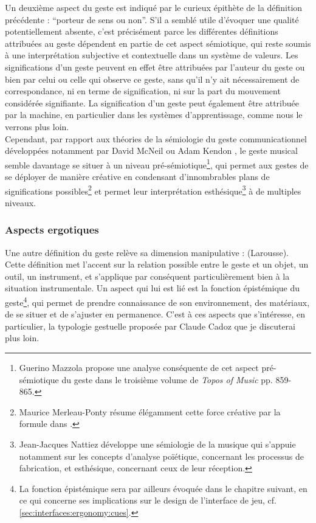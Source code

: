 \noindent Un deuxième aspect du geste est indiqué par le curieux épithète de la définition précédente : ``porteur de sens ou non''. S'il a semblé utile d'évoquer une qualité potentiellement absente, c'est précisément parce les différentes définitions attribuées au geste dépendent en partie de cet aspect sémiotique, qui reste soumis à une interprétation subjective et contextuelle dans un système de valeurs. Les significations d'un geste peuvent en effet être attribuées par l'auteur du geste ou bien par celui ou celle qui observe ce geste, sans qu'il n'y ait nécessairement de correspondance, ni en terme de signification, ni sur la part du mouvement considérée signifiante. La signification d'un geste peut également être attribuée par la machine, en particulier dans les systèmes d'apprentissage, comme nous le verrons plus loin.\\
\indent Cependant, par rapport aux théories de la sémiologie du geste communicationnel développées notamment par David McNeil \cite{mcneill_gesture_2005} ou Adam Kendon \cite{kendon_gesture:_2004}, le geste musical semble davantage se situer à un niveau pré-sémiotique\footnote{Guerino Mazzola propose une analyse conséquente de cet aspect pré-sémiotique du geste dans le troisième volume de \textit{Topos of Music} \cite{mazzola_topos_2018} pp. 859-865.}, qui permet aux gestes de se déployer de manière créative en condensant d'innombrables plans de significations possibles\footnote{Maurice Merleau-Ponty résume élégamment cette force créative par la formule  dans \cite{merleau-ponty_phenomenologie_1976}.} et permet leur interprétation esthésique\footnote{Jean-Jacques Nattiez développe une sémiologie de la musique qui s'appuie notamment sur les concepts d'analyse poïétique, concernant les processus de fabrication, et esthésique, concernant ceux de leur réception.} à de multiples niveaux.

\subsubsection{Aspects ergotiques}

\noindent Une autre définition du geste relève sa dimension manipulative :  (Larousse). Cette définition met l'accent sur la relation possible entre le geste et un objet, un outil, un instrument, et s'applique par conséquent particulièrement bien à la situation instrumentale. Un aspect qui lui est lié est la fonction épistémique du geste\footnote{La fonction épistémique sera par ailleurs évoquée dans le chapitre suivant, en ce qui concerne ses implications sur le design de l'interface de jeu, cf. \ref{sec:interfaces:ergonomy:cues}.}, qui permet de prendre connaissance de son environnement, des matériaux, de se situer et de s'ajuster en permanence. C'est à ces aspects que s'intéresse, en particulier, la typologie gestuelle proposée par Claude Cadoz que je discuterai plus loin.\\

